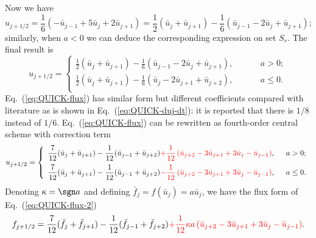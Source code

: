 \documentclass[]{article}
\begin{document}
Now we have
\[u_{j+1/2}=\frac{1}{6}(-\bar u_{j-1}+5\bar u_j+2\bar u_{j+1})=\frac{1}{2}(\bar
u_j+\bar u_{j+1})-\frac{1}{6}(\bar u_{j-1}-2\bar u_j+\bar u_{j+1});\]
similarly, when $a<0$ we can deduce the corresponding expression on set
$S_r$. The final result is
\begin{equation}
  u_{j+1/2}=\left\{\begin{array}{ll}
  \displaystyle
  \frac{1}{2}(\bar u_j+\bar u_{j+1})-\frac{1}{6}(\bar u_{j-1}-2\bar u_j+\bar u_{j+1}),\hspace{1cm} & a>0;\\[3mm]
  \displaystyle
  \frac{1}{2}(\bar u_j+\bar u_{j+1})-\frac{1}{6}(\bar u_j-2\bar
  u_{j+1}+\bar u_{j+2}),\hspace{1cm} & a\leq 0.\\
  \end{array}\right.
  \label{eq:QUICK-flux}
\end{equation}
Eq.~(\ref{eq:QUICK-flux}) has similar form but different coefficients compared
with literature \cite{leonard1979stable} as is shown in
Eq.~(\ref{eq:QUICK-duj-dt}): it is reported that there is $1/8$
instead of $1/6$.
Eq.~(\ref{eq:QUICK-flux}) can be rewritten as fourth-order central scheme with
correction term
\begin{equation}
  u_{j+1/2}=\left\{\begin{array}{ll}
  \displaystyle
  \frac{7}{12}(\bar u_j+\bar u_{j+1})-\frac{1}{12}(\bar u_{j-1}+\bar u_{j+2}){\color{red}+\frac{1}{12}\left(\bar u_{j+2}-3\bar u_{j+1}+3\bar u_{j}-\bar u_{j-1} \right)}     ,\hspace{2mm} & a>0;\\[3mm]
  \displaystyle
  \frac{7}{12}(\bar u_j+\bar u_{j+1})-\frac{1}{12}(\bar u_{j-1}+\bar
  u_{j+2}){\color{red}-\frac{1}{12}\left(\bar u_{j+2}-3\bar u_{j+1}+3\bar
    u_{j}-\bar u_{j-1} \right)}     ,\hspace{2mm} & a\leq 0.\\
  \end{array}\right.
  \label{eq:QUICK-flux-2}
\end{equation}
Denoting $\kappa = \sgn a$ and defining $\bar f_j = f(\bar u_j) = a\bar u_j$, we
have the flux form of Eq.~(\ref{eq:QUICK-flux-2})
\begin{equation}
  f_{j+1/2}=
  \frac{7}{12}(\bar f_j+\bar f_{j+1})-\frac{1}{12}(\bar f_{j-1}+\bar
  f_{j+2}){\color{red}+\frac{1}{12}\kappa a\left(\bar u_{j+2}-3\bar u_{j+1}+3\bar
    u_{j}-\bar u_{j-1} \right)}.
  \label{eq:QUICK-flux-3}
\end{equation}
\end{document}
